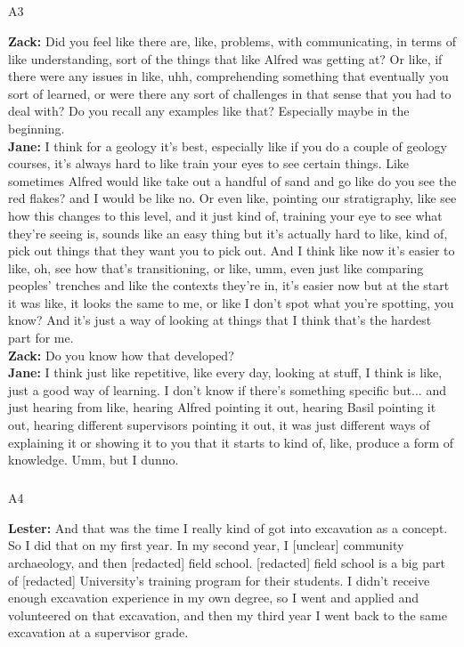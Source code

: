 \documentclass[
]{article}
\makeatletter
\let\oldsubparagraph\subparagraph
\renewcommand{\subparagraph}{
    \@ifstar
      \xxxSubParagraphStar
      \xxxSubParagraphNoStar
  }
\newcommand{\xxxSubParagraphStar}[1]{\oldsubparagraph*{#1}\mbox{}}
\newcommand{\xxxSubParagraphNoStar}[1]{\oldsubparagraph{#1}\mbox{}}
\makeatother
\begin{document}
\subparagraph{A3}\label{sec-A3}

\textbf{Zack:} Did you feel like there are, like, problems, with
communicating, in terms of like understanding, sort of the things that
like Alfred was getting at? Or like, if there were any issues in like,
uhh, comprehending something that eventually you sort of learned, or
were there any sort of challenges in that sense that you had to deal
with? Do you recall any examples like that? Especially maybe in the
beginning.\\
\textbf{Jane:} I think for a geology it's best, especially like if you
do a couple of geology courses, it's always hard to like train your eyes
to see certain things. Like sometimes Alfred would like take out a
handful of sand and go like do you see the red flakes? and I would be
like no. Or even like, pointing our stratigraphy, like see how this
changes to this level, and it just kind of, training your eye to see
what they're seeing is, sounds like an easy thing but it's actually hard
to like, kind of, pick out things that they want you to pick out. And I
think like now it's easier to like, oh, see how that's transitioning, or
like, umm, even just like comparing peoples' trenches and like the
contexts they're in, it's easier now but at the start it was like, it
looks the same to me, or like I don't spot what you're spotting, you
know? And it's just a way of looking at things that I think that's the
hardest part for me.\\
\textbf{Zack:} Do you know how that developed?\\
\textbf{Jane:} I think just like repetitive, like every day, looking at
stuff, I think is like, just a good way of learning. I don't know if
there's something specific but... and just hearing from like, hearing
Alfred pointing it out, hearing Basil pointing it out, hearing different
supervisors pointing it out, it was just different ways of explaining it
or showing it to you that it starts to kind of, like, produce a form of
knowledge. Umm, but I dunno.

\subparagraph{A4}\label{sec-A4}

\textbf{Lester:} And that was the time I really kind of got into
excavation as a concept. So I did that on my first year. In my second
year, I {[}unclear{]} community archaeology, and then {[}redacted{]}
field school. {[}redacted{]} field school is a big part of
{[}redacted{]} University's training program for their students. I
didn't receive enough excavation experience in my own degree, so I went
and applied and volunteered on that excavation, and then my third year I
went back to the same excavation at a supervisor grade.
\end{document}
